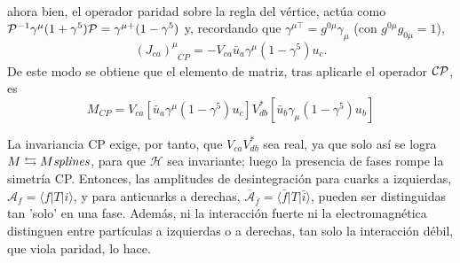 \begin{subappendices}
\begin{align*}
\end{align*}
ahora bien, el operador paridad sobre la regla del vértice, actúa como 
$\mathcal{P}^{-1} \gamma^{\mu} (1+ \gamma^5) \mathcal{P} = \gamma^{\mu +} (1- \gamma^5)$ y, recordando que $\gamma^{\mu \top} = g^{0\mu} \gamma_{\mu}$ (con $g^{0 \mu} g_{0 \mu} = 1$),
\[(J_{ca})_{\phantom{\mu} CP}^{\mu} = - V_{ca} \bar{u}_a \gamma^{\mu} (1- \gamma^5) u_c.\]
De este modo se obtiene que el elemento de matriz, tras aplicarle el operador $\mathcal{CP}$, es
\[M_{CP} = V_{ca}  [\bar{u}_a \gamma^{\mu} (1-\gamma^5)  u_c ] V_{db}^* [\bar{u}_b \gamma_{\mu} (1 -\gamma^5) u_b]\]

La invariancia CP exige, por tanto, que $V_{ca} V_{db}^*$ sea real, ya que solo así se logra $M \leftrightarrows M\emph{splines}$, para que $\mathcal{H}$ sea invariante; luego la presencia de fases rompe la simetría CP.
%
Entonces, las amplitudes de desintegración para cuarks a izquierdas, $\mathcal{A}_f = \langle f |T|i\rangle$, y para anticuarks a derechas, $\overline{\mathcal{A}}_{\bar{f}} = \langle \bar f |T| \bar i\rangle$, pueden ser distinguidas tan 'solo' en una fase. Además, ni la interacción fuerte ni la electromagnética distinguen entre partículas a izquierdas o a derechas, tan solo la interacción débil, que viola paridad, lo hace.

	
\end{subappendices}

